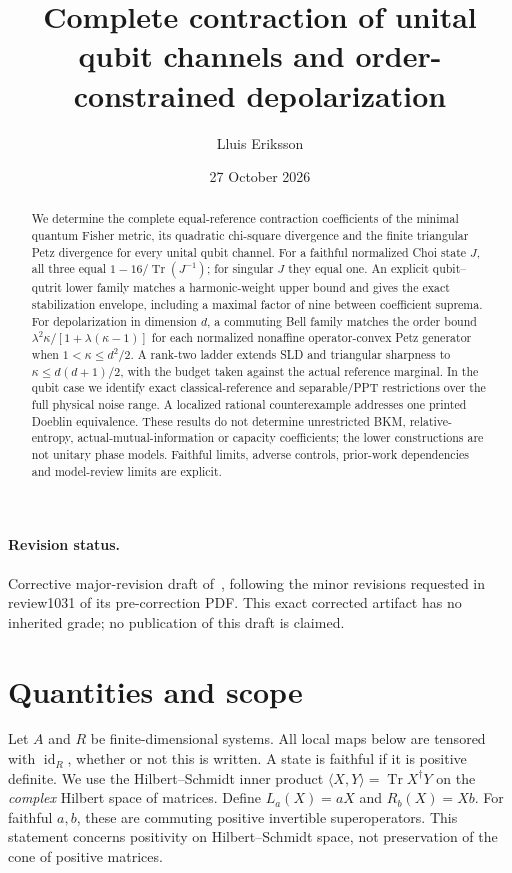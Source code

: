 \documentclass[11pt]{article}
\title{Complete contraction of unital qubit channels and order-constrained depolarization}
\author{Lluis Eriksson}
\date{27 October 2026}
\newcommand{\Tr}{\operatorname{Tr}}
\newcommand{\id}{\operatorname{id}}
\newcommand{\ip}[2]{\langle #1,#2\rangle}
\theoremstyle{remark}
\begin{document}
\maketitle
\begin{abstract}
We determine the complete equal-reference contraction coefficients of the minimal quantum Fisher metric, its quadratic chi-square divergence and the finite triangular Petz divergence for every unital qubit channel. For a faithful normalized Choi state $J$, all three equal $1-16/\Tr(J^{-1})$; for singular $J$ they equal one. An explicit qubit--qutrit lower family matches a harmonic-weight upper bound and gives the exact stabilization envelope, including a maximal factor of nine between coefficient suprema. For depolarization in dimension $d$, a commuting Bell family matches the order bound $\lambda^2\kappa/[1+\lambda(\kappa-1)]$ for each normalized nonaffine operator-convex Petz generator when $1<\kappa\le d^2/2$. A rank-two ladder extends SLD and triangular sharpness to $\kappa\le d(d+1)/2$, with the budget taken against the actual reference marginal. In the qubit case we identify exact classical-reference and separable/PPT restrictions over the full physical noise range. A localized rational counterexample addresses one printed Doeblin equivalence. These results do not determine unrestricted BKM, relative-entropy, actual-mutual-information or capacity coefficients; the lower constructions are not unitary phase models. Faithful limits, adverse controls, prior-work dependencies and model-review limits are explicit.
\end{abstract}
\paragraph{Revision status.} Corrective major-revision draft of~\cite{VersionOne}, following the minor revisions requested in review1031 of its pre-correction PDF. This exact corrected artifact has no inherited grade; no publication of this draft is claimed.

\section{Quantities and scope}
Let \(A\) and \(R\) be finite-dimensional systems. All local maps below are tensored with \(\id_R\), whether or not this is written. A state is faithful if it is positive definite. We use the Hilbert--Schmidt inner product
\(\ip{X}{Y}=\Tr X^\dagger Y\) on the \emph{complex} Hilbert space of matrices. Define
\(L_a(X)=aX\) and \(R_b(X)=Xb\).
For faithful \(a,b\), these are commuting positive invertible superoperators. This statement concerns positivity on Hilbert--Schmidt space, not preservation of the cone of positive matrices.
\end{document}

